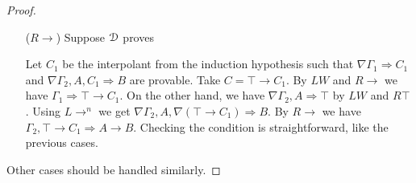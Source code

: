 \begin{proof}
\begin{enumerate}
	\item[($R \rightarrow$)] Suppose $\D$ proves
	\begin{prooftree}
  \end{prooftree}
  Let $C_1$ be the interpolant from the induction hypothesis such that $\nabla \Gamma_1 \Rightarrow C_1$ and $\nabla \Gamma_2, A, C_1 \Rightarrow B$ are provable. Take $C = \top \rightarrow C_1$. By $LW$ and $R \rightarrow$ we have $\Gamma_1 \Rightarrow \top \rightarrow C_1$. On the other hand, we have $\nabla \Gamma_2, A \Rightarrow \top$ by $LW$ and $R \top$. Using $L \rightarrow ^n$ we get $\nabla \Gamma_2, A, \nabla (\top \rightarrow C_1) \Rightarrow B$. By $R \rightarrow$ we have $\Gamma_2, \top \rightarrow C_1 \Rightarrow A \rightarrow B$. Checking the condition \3 is straightforward, like the previous cases.
\end{enumerate}

Other cases should be handled similarly.
\end{proof}